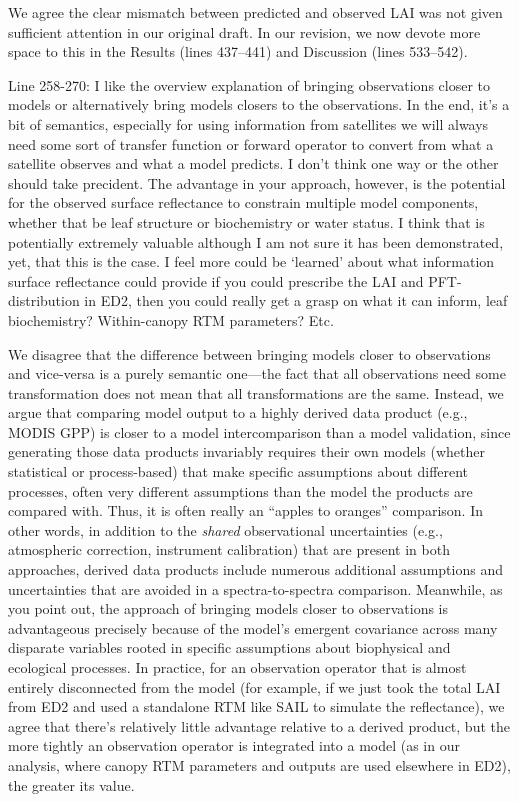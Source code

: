 We agree the clear mismatch between predicted and observed LAI was not given sufficient attention in our original draft.
In our revision, we now devote more space to this in the Results (lines 437--441) and Discussion (lines 533--542).

\begin{reviewer}
  Line 258-270: I like the overview explanation of bringing observations closer to models or alternatively bring models closers to the observations. In the end, it’s a bit of semantics, especially for using information from satellites we will always need some sort of transfer function or forward operator to convert from what a satellite observes and what a model predicts. I don’t think one way or the other should take precident. The advantage in your approach, however, is the potential for the observed surface reflectance to constrain multiple model components, whether that be leaf structure or biochemistry or water status. I think that is potentially extremely valuable although I am not sure it has been demonstrated, yet, that this is the case. I feel more could be ‘learned’ about what information surface reflectance could provide if you could prescribe the LAI and PFT-distribution in ED2, then you could really get a grasp on what it can inform, leaf biochemistry? Within-canopy RTM parameters? Etc.
\end{reviewer}

We disagree that the difference between bringing models closer to observations and vice-versa is a purely semantic one---the fact that all observations need some transformation does not mean that all transformations are the same.
Instead, we argue that comparing model output to a highly derived data product (e.g., MODIS GPP) is closer to a model intercomparison than a model validation, since generating those data products invariably requires their own models (whether statistical or process-based) that make specific assumptions about different processes, often very different assumptions than the model the products are compared with.
Thus, it is often really an ``apples to oranges'' comparison.
In other words, in addition to the \emph{shared} observational uncertainties (e.g., atmospheric correction, instrument calibration) that are present in both approaches, derived data products include numerous additional assumptions and uncertainties that are avoided in a spectra-to-spectra comparison.
Meanwhile, as you point out, the approach of bringing models closer to observations is advantageous precisely because of the model’s emergent covariance across many disparate variables rooted in specific assumptions about biophysical and ecological processes.
In practice, for an observation operator that is almost entirely disconnected from the model (for example, if we just took the total LAI from ED2 and used a standalone RTM like SAIL to simulate the reflectance), we agree that there’s relatively little advantage relative to a derived product,
but the more tightly an observation operator is integrated into a model (as in our analysis, where canopy RTM parameters and outputs are used elsewhere in ED2), the greater its value.

